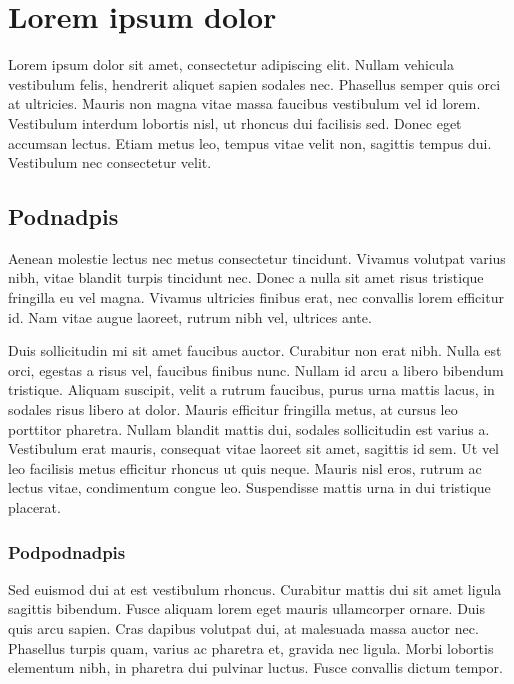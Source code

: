 \section{Lorem ipsum dolor} %
Lorem ipsum dolor sit amet, consectetur adipiscing elit. Nullam vehicula vestibulum felis, hendrerit aliquet sapien sodales nec. Phasellus semper quis orci at ultricies. Mauris non magna vitae massa faucibus vestibulum vel id lorem. Vestibulum interdum lobortis nisl, ut rhoncus dui facilisis sed. Donec eget accumsan lectus. Etiam metus leo, tempus vitae velit non, sagittis tempus dui. Vestibulum nec consectetur velit.

\subsection{Podnadpis}
Aenean molestie lectus nec metus consectetur tincidunt. Vivamus volutpat varius nibh, vitae blandit turpis tincidunt nec. Donec a nulla sit amet risus tristique fringilla eu vel magna. Vivamus ultricies finibus erat, nec convallis lorem efficitur id. Nam vitae augue laoreet, rutrum nibh vel, ultrices ante. 

Duis sollicitudin mi sit amet faucibus auctor. Curabitur non erat nibh. Nulla est orci, egestas a risus vel, faucibus finibus nunc. Nullam id arcu a libero bibendum tristique. Aliquam suscipit, velit a rutrum faucibus, purus urna mattis lacus, in sodales risus libero at dolor. Mauris efficitur fringilla metus, at cursus leo porttitor pharetra. Nullam blandit mattis dui, sodales sollicitudin est varius a. Vestibulum erat mauris, consequat vitae laoreet sit amet, sagittis id sem. Ut vel leo facilisis metus efficitur rhoncus ut quis neque. Mauris nisl eros, rutrum ac lectus vitae, condimentum congue leo. Suspendisse mattis urna in dui tristique placerat.

\subsubsection{Podpodnadpis}
Sed euismod dui at est vestibulum rhoncus. Curabitur mattis dui sit amet ligula sagittis bibendum. Fusce aliquam lorem eget mauris ullamcorper ornare. Duis quis arcu sapien. Cras dapibus volutpat dui, at malesuada massa auctor nec. Phasellus turpis quam, varius ac pharetra et, gravida nec ligula. Morbi lobortis elementum nibh, in pharetra dui pulvinar luctus. Fusce convallis dictum tempor.

